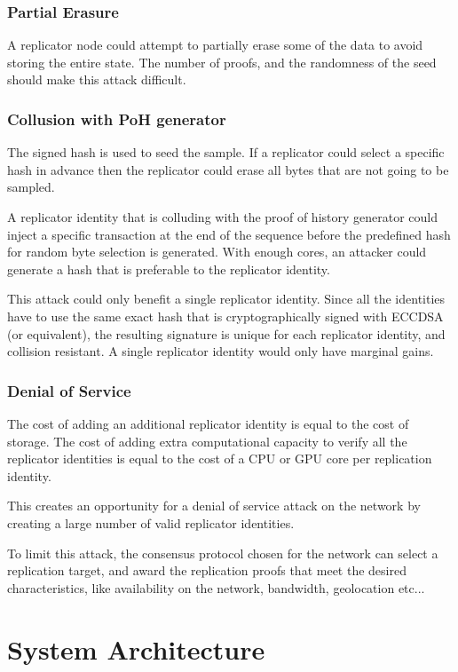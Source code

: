 \documentclass[12pt]{article}
\begin{document}
\subsubsection{Partial Erasure}

A replicator node could attempt to partially erase some of the data to avoid storing the entire state. The number of proofs, and the randomness of the seed should make this attack difficult.

\subsubsection{Collusion with PoH generator}

The signed hash is used to seed the sample. If a replicator could select a specific hash in advance then the replicator could erase all bytes that are not going to be sampled.

A replicator identity that is colluding with the proof of history generator could inject a specific transaction at the end of the sequence before the predefined hash for random byte selection is generated. With enough cores, an attacker could generate a hash that is preferable to the replicator identity.

This attack could only benefit a single replicator identity. Since all the identities have to use the same exact hash that is cryptographically signed with ECCDSA (or equivalent), the resulting signature is unique for each replicator identity, and collision resistant. A single replicator identity would only have marginal gains.
\subsubsection{Denial of Service}
The cost of adding an additional replicator identity is equal to the cost of storage. The cost of adding extra computational capacity to verify all the replicator identities is equal to the cost of a CPU or GPU core per replication identity.

This creates an opportunity for a denial of service attack on the network by creating a large number of valid replicator identities.

To limit this attack, the consensus protocol chosen for the network can select a replication target, and award the replication proofs that meet the desired characteristics, like availability on the network, bandwidth, geolocation etc...
\section{System Architecture}\label{system_architecture}
\end{document}
